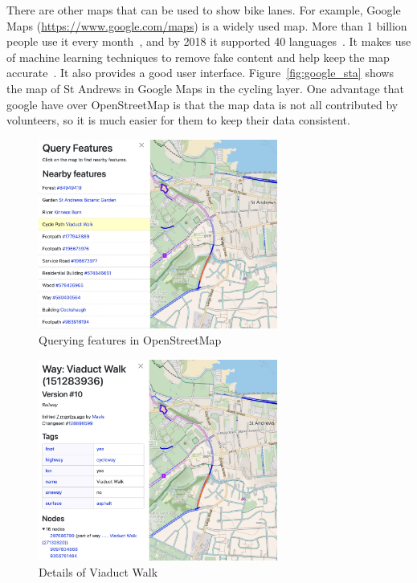 \documentclass[12pt,a4paper]{report}
\begin{document}
There are other maps that can be used to show bike lanes. For example, Google Maps (\url{https://www.google.com/maps}) is a widely used map. More than 1 billion people use it every month~\cite{ethan2019}, and by 2018 it supported 40 languages~\cite{yamagami2018}. It makes use of machine learning techniques to remove fake content and help keep the map accurate~\cite{gupta2023}. It also provides a good user interface. Figure~\ref{fig:google_sta} shows the map of St Andrews in Google Maps in the cycling layer. One advantage that google have over OpenStreetMap is that the map data is not all contributed by volunteers, so it is much easier for them to keep their data consistent.

\begin{figure}[ht!]
    \centering
    \includegraphics[width=0.7\textwidth,trim={0 8cm 5cm 0},clip]{plan_images/feature.png}
    \caption{Querying features in OpenStreetMap}
    \label{fig:feature_query}
\end{figure}

\begin{figure}[ht!]
    \centering
    \includegraphics[width=0.7\textwidth,trim={0 5cm 5cm 0},clip]{plan_images/cycleway.png}
    \caption{Details of Viaduct Walk}
    \label{fig:cycleway_query}
\end{figure}
\end{document}
